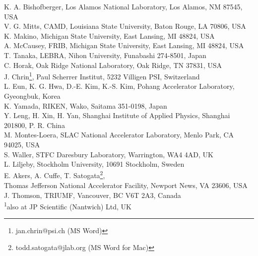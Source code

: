 \documentclass[a4paper,
]{jacow}
\begin{document}
{		K. A. Bishofberger, Los Alamos National Laboratory, Los Alamos, NM 87545, USA \\
		V. G. Mitts, CAMD, Louisiana State University, Baton Rouge, LA 70806, USA \\ 
		K. Makino, Michigan State University, East Lansing, MI 48824, USA \\
		A. McCausey, FRIB, Michigan State University, East Lansing, MI 48824, USA \\
		T. Tanaka, LEBRA, Nihon University, Funabashi 274-8501, Japan \\
		C. Horak, Oak Ridge National Laboratory, Oak Ridge, TN 37831, USA \\
		J. Chrin\thanks{jan.chrin@psi.ch (MS Word)}, Paul Scherrer Institut, 5232 Villigen PSI, Switzerland \\
		L. Eun, K. G. Hwa, D.-E. Kim, K.-S. Kim, Pohang Accelerator Laboratory, Gyeongbuk, Korea \\
		K. Yamada, RIKEN, Wako, Saitama 351-0198, Japan \\
		Y. Leng, H. Xin, H. Yan, Shanghai Institute of Applied Physics, Shanghai 201800, P. R. China \\
		M. Montes-Loera, SLAC National Accelerator Laboratory, Menlo Park, CA 94025, USA \\
		S. Waller, STFC Daresbury Laboratory, Warrington, WA4 4AD, UK \\
		L. Liljeby, Stockholm University, 10691 Stockholm, Sweden \\
		E. Akers, A. Cuffe, T. Satogata\thanks{todd.satogata@jlab.org (MS Word for Mac)},\\
		Thomas Jefferson National Accelerator Facility, Newport News, VA 23606, USA \\
		J. Thomson, TRIUMF, Vancouver, BC V6T 2A3, Canada \\
		\textsuperscript{1}also at JP Scientific (Nantwich) Ltd, UK}

	\maketitle

\raggedend
\end{document}
